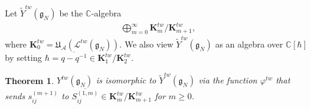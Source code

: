 \documentclass[11pt]{article}
\newtheorem{theorem}{Theorem}
\numberwithin{theorem}{section}
\numberwithin{proposition}{section}
\numberwithin{lemma}{section}
\numberwithin{corollary}{section}
\numberwithin{definition}{section}
\numberwithin{example}{section}
\numberwithin{remark}{section}
\numberwithin{note}{section}
\numberwithin{equation}{section}
\begin{document}
Let $\widetilde{Y}^{tw}(\mathfrak{g}_N)$ be the $\mathbb{C}$-algebra
\begin{gather*}
\bigoplus_{m=0}^{\infty} \mathbf{K}_m^{tw}/\mathbf{K}_{m+1}^{tw},
\end{gather*}
where $\mathbf{K}_0^{tw} = \mathfrak{U}_{\mathcal{A}}(\mathcal{L}^{tw}(\mathfrak{g}_N))$.
We also view $\widetilde{Y}^{tw}(\mathfrak{g}_N)$ as an algebra over $\mathbb{C}[\hbar]$ by setting $\hbar =
\overline{q-q^{-1}} \in \mathbf{K}_1^{tw}/\mathbf{K}_2^{tw}$.

\begin{theorem}
\label{twUqY2}
$Y^{tw}(\mathfrak{g}_N)$ is isomorphic to $\widetilde{Y}^{tw}(\mathfrak{g}_N)$ via the function $\varphi^{tw}$ that
sends $s_{ij}^{(m+1)}$ to $\overline{S_{ij}^{(1,m)}} \in \mathbf{K}_{m}^{tw}/\mathbf{K}_{m+1}^{tw}$ for $m \ge 0$.
\end{theorem}
\end{document}

